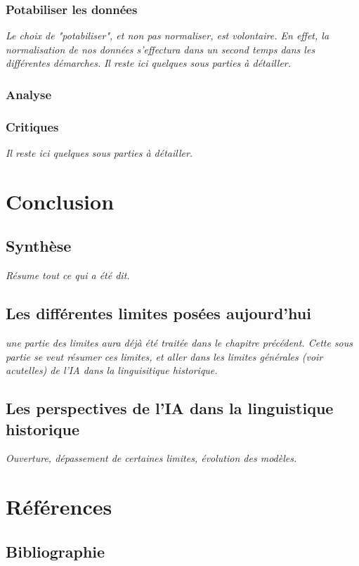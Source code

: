 \documentclass[12pt, french]{report}
\begin{document}
\subsection{Potabiliser les données}
\textit{Le choix de "potabiliser", et non pas normaliser, est volontaire. En effet, la normalisation de nos données s'effectura dans un second temps dans les différentes démarches.}
\textit{Il reste ici quelques sous parties à détailler.}

\subsection{Analyse}
\subsection{Critiques}
\textit{Il reste ici quelques sous parties à détailler.}

\chapter{Conclusion}
\section{Synthèse}
\textit{Résume tout ce qui a été dit.}
\section{Les différentes limites posées aujourd'hui}
\textit{une partie des limites aura déjà été traitée dans le chapitre précédent. Cette sous partie se veut résumer ces limites, et aller dans les limites générales (voir acutelles) de l'IA dans  la linguisitique historique.}
\section{Les perspectives de l'IA dans la linguistique historique}
\textit{Ouverture, dépassement de certaines limites, évolution des modèles.}

\chapter{Références}
\section{Bibliographie}

\printbibliography
\end{document}
